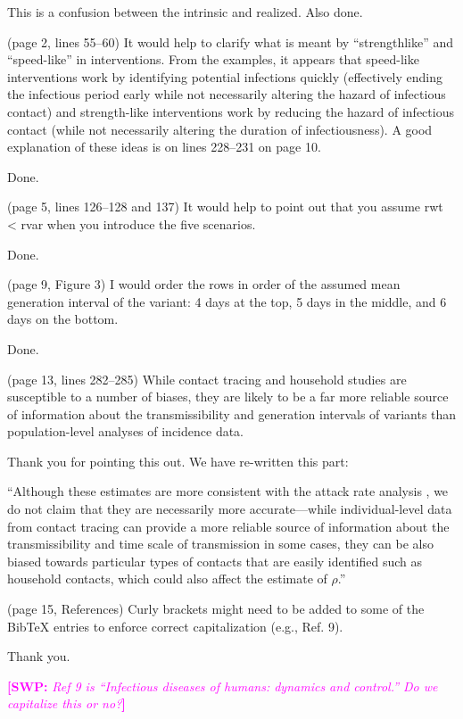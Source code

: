 \documentclass[12pt]{article}
\newcommand{\revtext}{\textsf}
\newcommand{\comment}[3]{\textcolor{#1}{\textbf{[#2: }\textsl{#3}\textbf{]}}}
\newcommand{\swp}[1]{\comment{magenta}{SWP}{#1}}
\begin{document}
This is a confusion between the intrinsic and realized. Also done.


\revtext{ (page 2, lines 55–60) It would help to clarify what is meant by “strengthlike” and “speed-like” in interventions. From the examples, it appears that
speed-like interventions work by identifying potential infections quickly
(effectively ending the infectious period early while not necessarily altering
the hazard of infectious contact) and strength-like interventions work by
reducing the hazard of infectious contact (while not necessarily altering
the duration of infectiousness). A good explanation of these ideas is on
lines 228–231 on page 10.}

Done.

\revtext{(page 5, lines 126–128 and 137) It would help to point out that you assume
rwt < rvar when you introduce the five scenarios.}

Done.

\revtext{(page 9, Figure 3) I would order the rows in order of the assumed mean
generation interval of the variant: 4 days at the top, 5 days in the middle,
and 6 days on the bottom.}

Done.

\revtext{(page 13, lines 282–285) While contact tracing and household studies are
susceptible to a number of biases, they are likely to be a far more reliable
source of information about the transmissibility and generation intervals
of variants than population-level analyses of incidence data.}

Thank you for pointing this out. We have re-written this part:

``Although these estimates are more consistent with the attack rate analysis \citep{ukinvest},
we do not claim that they are necessarily more accurate---while individual-level data from contact tracing can provide a more reliable source of information about the transmissibility and time scale of transmission in some cases, they can be also biased towards particular types of contacts that are easily identified such as household contacts, which could also affect the estimate of $\rho$.''

\revtext{(page 15, References) Curly brackets might need to be added to some of
the BibTeX entries to enforce correct capitalization (e.g., Ref. 9).}

Thank you.

\swp{Ref 9 is ``Infectious diseases of humans: dynamics and control.'' Do we capitalize this or no?}
\end{document}
